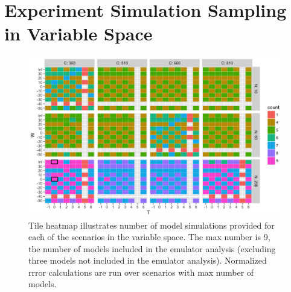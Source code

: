 \documentclass[10pt]{article}
\begin{document}
\\

\vspace{3mm}




\clearpage

\renewcommand{\thefigure}{S\arabic{figure}}


\section{Experiment Simulation Sampling in Variable Space}
\begin{figure}[h!]
\centering
\includegraphics[width=\textwidth]{s_how_many_simulations.png}
\caption{Tile heatmap illustrates number of model simulations provided for each of the scenarios in the variable space. The max number is 9, the number of models included in the emulator analysis (excluding three models not included in the emulator analysis). Normalized rrror calculations are run over scenarios with max number of models.}
\label{fig:numbersims}
\end{figure}

\clearpage
\end{document}

